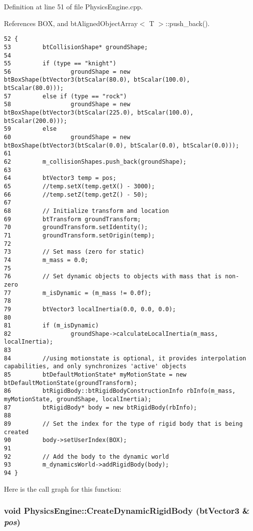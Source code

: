 Definition at line 51 of file PhysicsEngine.cpp.

References BOX, and btAlignedObjectArray$<$ T $>$::push\_\-back().

\begin{Code}\begin{verbatim}52 {
53         btCollisionShape* groundShape;
54 
55         if (type == "knight")
56                 groundShape = new btBoxShape(btVector3(btScalar(80.0), btScalar(100.0), btScalar(80.0)));
57         else if (type == "rock")
58                 groundShape = new btBoxShape(btVector3(btScalar(225.0), btScalar(100.0), btScalar(200.0)));
59         else
60                 groundShape = new btBoxShape(btVector3(btScalar(0.0), btScalar(0.0), btScalar(0.0)));
61 
62         m_collisionShapes.push_back(groundShape);
63 
64         btVector3 temp = pos;
65         //temp.setX(temp.getX() - 3000);
66         //temp.setZ(temp.getZ() - 50);
67 
68         // Initialize transform and location
69         btTransform groundTransform;
70         groundTransform.setIdentity();
71         groundTransform.setOrigin(temp);
72 
73         // Set mass (zero for static)
74         m_mass = 0.0;
75 
76         // Set dynamic objects to objects with mass that is non-zero
77         m_isDynamic = (m_mass != 0.0f);
78 
79         btVector3 localInertia(0.0, 0.0, 0.0);
80 
81         if (m_isDynamic)
82                 groundShape->calculateLocalInertia(m_mass, localInertia);
83 
84         //using motionstate is optional, it provides interpolation capabilities, and only synchronizes 'active' objects
85         btDefaultMotionState* myMotionState = new btDefaultMotionState(groundTransform);
86         btRigidBody::btRigidBodyConstructionInfo rbInfo(m_mass, myMotionState, groundShape, localInertia);
87         btRigidBody* body = new btRigidBody(rbInfo);
88 
89         // Set the index for the type of rigid body that is being created
90         body->setUserIndex(BOX);
91 
92         // Add the body to the dynamic world
93         m_dynamicsWorld->addRigidBody(body);
94 }
\end{verbatim}
\end{Code}




Here is the call graph for this function:\hypertarget{class_physics_engine_549c7e9116d06e8f7599497c3c4f6fd1}{
\subsubsection[CreateDynamicRigidBody]{\setlength{\rightskip}{0pt plus 5cm}void PhysicsEngine::CreateDynamicRigidBody (btVector3 \& {\em pos})}}
\label{class_physics_engine_549c7e9116d06e8f7599497c3c4f6fd1}



